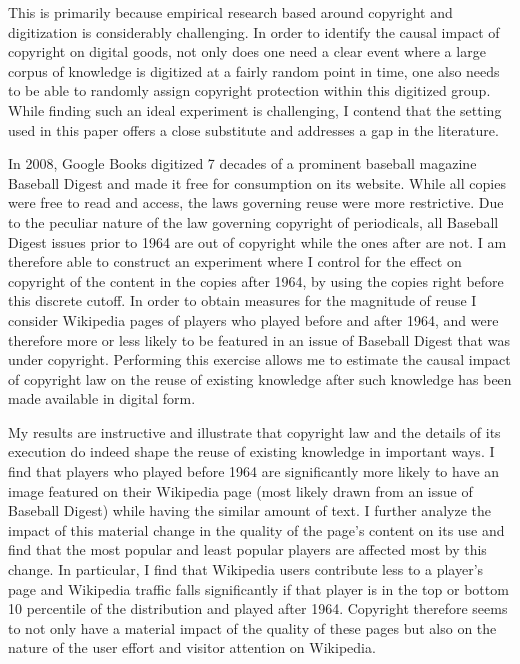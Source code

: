 \documentclass[12pt]{article}
\begin{document}
This is primarily because empirical research based around copyright and digitization is considerably challenging. In order to identify the causal impact of copyright on digital goods, not only does one need a clear event where a large corpus of knowledge is digitized at a fairly random point in time, one also needs to be able to randomly assign copyright protection within this digitized group. While finding such an ideal experiment is challenging, I contend that the setting used in this paper offers a close substitute and  addresses a gap in the literature.


In 2008, Google Books digitized 7 decades of a prominent baseball magazine Baseball Digest and made it free for consumption on its website. While all copies were free to read and access, the laws governing reuse were more restrictive. Due to the peculiar nature of the law governing copyright of periodicals, all Baseball Digest issues prior to 1964 are out of copyright while the ones after are not. I am therefore able to construct an experiment where I control for the effect on copyright of the content in the copies after 1964, by using the copies right before this discrete cutoff. In order to obtain measures for the magnitude of reuse I consider Wikipedia pages of players who played before and after 1964, and were therefore more or less likely to be featured in an issue of Baseball Digest that was under copyright. Performing this exercise allows me to estimate the causal impact of copyright law on the reuse of existing knowledge after such knowledge has been made available in digital form.

My results are instructive and illustrate that copyright law and the details of its execution do indeed shape the reuse of existing knowledge in important ways. I find that players who played before 1964 are significantly more likely to have an image featured on their Wikipedia page (most likely drawn from an issue of Baseball Digest) while having the similar amount of text. I further analyze the impact of this material change in the quality of the page's content on its use and find that the most popular and least popular players are affected most by this change. In particular, I find that Wikipedia users contribute less to a player's page and Wikipedia traffic falls significantly if that player is in the top or bottom 10 percentile of the distribution and played after 1964. Copyright therefore seems to not only have a material impact of the quality of these pages but also on the nature of the user effort and visitor attention on Wikipedia. 
\end{document}
